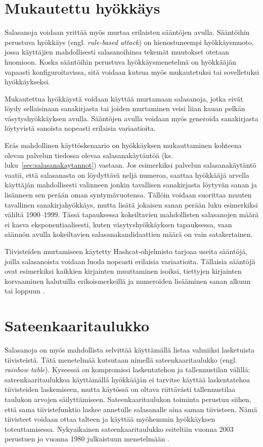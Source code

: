 \section{Mukautettu hyökkäys\label{sec:mukautettu_hyokkays}}

Salasanoja voidaan yrittää myös murtaa erilaisten sääntöjen avulla. Sääntöihin perustuva hyökkäys (engl. \textit{rule-based attack}) on hienostuneempi hyökkäysmuoto, jossa käyttäjien mahdollisesti salasanoihinsa tekemät muutokset otetaan huomioon. Koska sääntöihin perustuva hyökkäysmenetelmä on hyökkääjän vapaasti konfiguroitavissa, sitä voidaan kutsua myös mukautetuksi tai sovelletuksi hyökkäykseksi.

Mukautettua hyökkäystä voidaan käyttää murtamaan salasanoja, jotka eivät löydy sellaisinaan sanakirjasta tai joiden murtaminen veisi liian kauan pelkän väsytyshyökkäyksen avulla. Sääntöjen avulla voidaan myös generoida sanakirjasta löytyvistä sanoista nopeasti erilaisia variaatioita.

Eräs mahdollinen käyttöskenaario on hyökkäyksen mukauttaminen kohteena olevan palvelun tiedossa olevaa salasanakäytäntöä (ks. luku~\ref{sec:salasanakaytannot}) vastaan. Jos esimerkiksi palvelun salasanakäytäntö vaatii, että salasanasta on löydyttävä neljä numeroa, saattaa hyökkääjä arvella käyttäjän mahdollisesti valinneen jonkin tavallisen sanakirjasta löytyvän sanan ja lisänneen sen perään oman syntymävuotensa. Tällöin voidaan suorittaa muuten tavallinen sanakirjahyökkäys, mutta lisätä jokaisen sanan perään luku esimerkiksi väliltä 1900--1999. Tässä tapauksessa kokeiltavien mahdollisten salasanojen määrä ei kasva eksponentiaalisesti, kuten väsytyshyökkäyksen tapauksessa, vaan säännön avulla kokeiltavien salasanakandidaattien määrä on vain satakertainen.

Tiivisteiden murtamiseen käytetty Hashcat-ohjelmisto tarjoaa useita sääntöjä, joilla salasanoista voidaan luoda nopeasti erilaisia variaatioita. Tällaisia sääntöjä ovat esimerkiksi kaikkien kirjainten muuttaminen isoiksi, tiettyjen kirjainten korvaaminen halutuilla erikoismerkeillä ja numeroiden lisääminen sanan alkuun tai loppuun \citep{hashcat_rule_2023}. 

\section{Sateenkaaritaulukko\label{sec:sateenkaaritaulukko}}

Salasanoja on myös mahdollista selvittää käyttämällä listaa valmiiksi lasketuista tiivisteistä. Tätä menetelmää kutsutaan nimellä sateenkaaritaulukko (engl. \textit{rainbow table}). Kyseessä on kompromissi laskentatehon ja tallennustilan välillä: sateenkaaritaulukkoa käyttämällä hyökkääjän ei tarvitse käyttää laskentatehoa tiivisteiden laskemiseen, mutta käytössä on oltava riittävästi tallennustilaa taulukon arvojen säilyttämiseen. Sateenkaaritaulukon toiminta perustuu siihen, että sama tiivistefunktio laskee annetulle salasanalle aina saman tiivisteen. Nämä tiivisteet voidaan ottaa talteen ja käyttää myöhemmin hyökkäyksen toteuttamisessa. Nykyaikainen sateenkaaritaulukko esiteltiin vuonna 2003 perustuen jo vuonna 1980 julkaistuun menetelmään \citep{oechslin_making_2003}.


